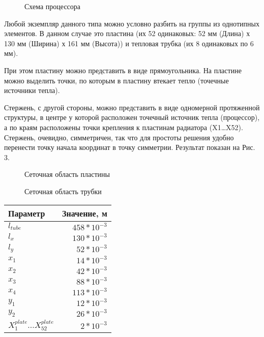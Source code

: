 \documentclass[a4paper]{article}
\begin{document}
\begin{figure}[h]
\caption{Схема процессора}
\label{ris:image}
\end{figure}

Любой экземпляр данного типа можно условно разбить на группы из однотипных элементов. В данном случае это пластина (их 52 одинаковых: 52 мм (Длина) х 130 мм (Ширина) х 161 мм (Высота)) и тепловая трубка (их 8 одинаковых по 6 мм).

При этом пластину можно представить в виде прямоугольника. На пластине можно выделить точки, по которым в пластину втекает тепло (точечные источники тепла).

Стержень, с другой стороны, можно представить в виде одномерной протяженной структуры, в центре у которой расположен точечный источник тепла (процессор), а по краям расположены точки крепления к пластинам радиатора (X1…X52). Стержень, очевидно, симметричен, так что для простоты решения удобно перенести точку начала координат в точку симметрии. Результат показан на Рис. 3.

\begin{figure}[h]
\caption{Сеточная область пластины}
\label{ris:image}
\end{figure}

\begin{figure}[h]
\caption{Сеточная область трубки}
\label{ris:image}
\end{figure}

\newpage
\begin{center}
\begin{tabular}{ | p{100pt} | r | }
\hline
Параметр & Значение, м   \\ \hline
$l_{tube}$ & $458*10^{-3}$  \\ \hline
$l_x$ & $130*10^{-3}$   \\ \hline
$l_y$ & $52*10^{-3}$  \\ \hline
$x_1$ & $14*10^{-3}$ \\ \hline
$x_2$ & $42*10^{-3}$   \\ \hline
$x_3$ & $88*10^{-3}$   \\ \hline
$x_4$ & $113*10^{-3}$  \\ \hline
$y_1$ & $12*10^{-3}$   \\ \hline
$y_2$ & $26*10^{-3}$   \\ \hline
$X_1^{plate}...X_{52}^{plate}$ & $2*10^{-3}$ \\
\hline
\end{tabular}
\end{center}
\end{document}
